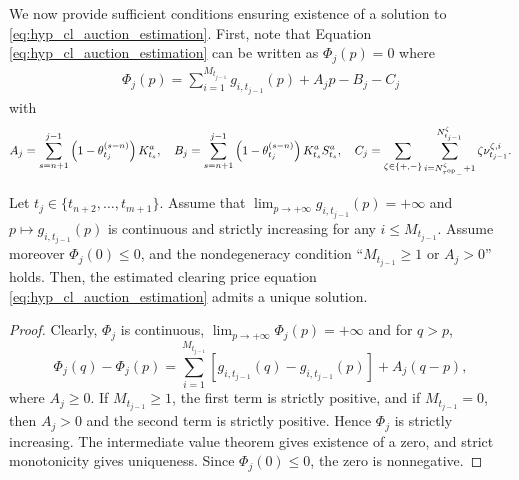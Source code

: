 \documentclass[11pt]{article}
\begin{document}
We now provide sufficient conditions ensuring existence of a solution to \eqref{eq:hyp_cl_auction_estimation}. First, note that Equation \eqref{eq:hyp_cl_auction_estimation} can be written as $\Phi_j(p)=0$ where
\begin{align*}
    \Phi_j(p) = \sum_{i=1}^{M_{t_{j-1}}} g_{i,t_{j-1}}(p) + A_jp-B_j-C_j
\end{align*}
with
\[A_j = \sum_{s=n+1}^{j-1} \left(1-\theta_{t_j}^{(s-n)}\right)K_{t_s}^a, \quad B_j = \sum_{s=n+1}^{j-1} \left(1-\theta_{t_j}^{(s-n)}\right)K_{t_s}^aS_{t_s}^a, \quad C_j = \sum_{\zeta \in \{+,-\}}\sum_{i={N_{{\tau^{\mathrm{op}}}_-}^\zeta+1}}^{N_{t_{j-1}}^\zeta} \zeta \nu_{t_{j-1}}^{\zeta,i}.\]

\begin{theorem}\label{th:clearing}
Let $t_j \in \{t_{n+2},\ldots,t_{m+1}\}$. Assume that $\lim_{p\to +\infty} g_{i,t_{j-1}}(p)=+\infty$
and $p\longmapsto g_{i,t_{j-1}}(p)$ is continuous and strictly increasing for any $i\leqslant M_{t_{j-1}}$. Assume moreover $\Phi_j(0)\leqslant 0$, and the nondegeneracy condition ``$M_{t_{j-1}}\geqslant 1$ or $A_j > 0$'' holds. Then, the estimated clearing price equation \eqref{eq:hyp_cl_auction_estimation} admits a unique solution. 
\end{theorem}

\begin{proof}
Clearly, $\Phi_j$ is continuous, $\lim_{p\to +\infty} \Phi_j(p) = +\infty$ and for $q>p$,
\[\Phi_j(q)-\Phi_j(p) = \sum_{i=1}^{M_{t_{j-1}}} \left[g_{i,t_{j-1}}(q)-g_{i,t_{j-1}}(p)\right] + A_j(q-p), \]
where $A_j \geqslant 0$. If $M_{t_{j-1}}\geqslant 1$, the first term is strictly positive, and if $M_{t_{j-1}}=0$, then $A_j>0$ and the second term is strictly positive. Hence $\Phi_j$ is strictly increasing. The intermediate value theorem gives existence of a zero, and strict monotonicity gives uniqueness. Since $\Phi_j(0)\leqslant 0$, the zero is nonnegative.
\end{proof}
\end{document}
